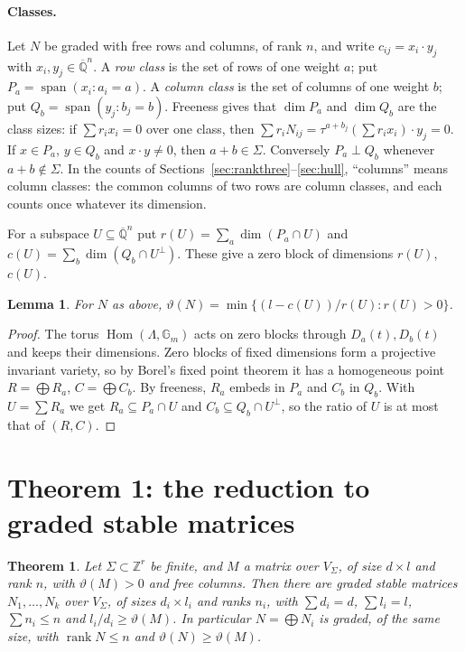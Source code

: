 \documentclass[11pt,a4paper]{article}
\theoremstyle{plain}
\newtheorem{theorem}{Theorem}
\newtheorem{lemma}{Lemma}[section]
\theoremstyle{definition}
\newcommand{\Z}{\mathbb{Z}}
\newcommand{\Qbar}{\overline{\mathbb{Q}}}
\newcommand{\spn}{\operatorname{span}}
\newcommand{\rk}{\operatorname{rank}}
\newcommand{\Gm}{\mathbb{G}_{m}}
\newcommand{\vth}{\vartheta}
\newcommand{\Hom}{\operatorname{Hom}}
\begin{document}
\paragraph{Classes.} Let $N$ be graded with free rows and columns, of rank $n$, and write $c_{ij}=x_{i}\cdot y_{j}$ with
$x_{i},y_{j}\in\Qbar^{n}$. A \emph{row class} is the set of rows of one weight $a$; put $P_{a}=\spn(x_{i}:a_{i}=a)$. A
\emph{column class} is the set of columns of one weight $b$; put $Q_{b}=\spn(y_{j}:b_{j}=b)$. Freeness gives that $\dim P_{a}$ and $\dim Q_{b}$ are
the class sizes: if $\sum r_{i}x_{i}=0$ over one class, then $\sum r_{i}N_{ij}=\tau^{a+b_{j}}(\sum r_{i}x_{i})\cdot y_{j}=0$. If $x\in P_{a}$, $y\in Q_{b}$ and
$x\cdot y\neq0$, then $a+b\in\Sigma$. Conversely $P_{a}\perp Q_{b}$ whenever $a+b\notin\Sigma$. In the counts of Sections~\ref{sec:rankthree}--\ref{sec:hull},
``columns'' means column classes: the common columns of two rows are column classes, and each counts once whatever its dimension.

For a subspace $U\subseteq\Qbar^{n}$ put $r(U)=\sum_{a}\dim(P_{a}\cap U)$ and $c(U)=\sum_{b}\dim(Q_{b}\cap U^{\perp})$. These give a zero
block of dimensions $r(U)$, $c(U)$.

\begin{lemma}\label{lem:gradedblocks}
For $N$ as above, $\vth(N)=\min\{(l-c(U))/r(U):r(U)>0\}$.
\end{lemma}

\begin{proof}
The torus $\Hom(\Lambda,\Gm)$ acts on zero blocks through $D_{a}(t),D_{b}(t)$ and keeps their dimensions. Zero blocks of fixed dimensions form a
projective invariant variety, so by Borel's fixed point theorem it has a homogeneous point $R=\bigoplus R_{a}$, $C=\bigoplus C_{b}$. By freeness,
$R_{a}$ embeds in $P_{a}$ and $C_{b}$ in $Q_{b}$. With $U=\sum R_{a}$ we get $R_{a}\subseteq P_{a}\cap U$ and $C_{b}\subseteq Q_{b}\cap U^{\perp}$, so the
ratio of $U$ is at most that of $(R,C)$.
\end{proof}

\section{Theorem 1: the reduction to graded stable matrices}\label{sec:reduction}

\begin{theorem}\label{thm:reduction}
Let $\Sigma\subset\Z^{r}$ be finite, and $M$ a matrix over $V_{\Sigma}$, of size $d\times l$ and rank $n$, with $\vth(M)>0$ and free columns.
Then there are graded stable matrices $N_{1},\dots,N_{k}$ over $V_{\Sigma}$, of sizes $d_{i}\times l_{i}$ and ranks $n_{i}$, with $\sum d_{i}=d$,
$\sum l_{i}=l$, $\sum n_{i}\le n$ and $l_{i}/d_{i}\ge\vth(M)$. In particular $N=\bigoplus N_{i}$ is graded, of the same size, with $\rk N\le n$
and $\vth(N)\ge\vth(M)$.
\end{theorem}
\end{document}
